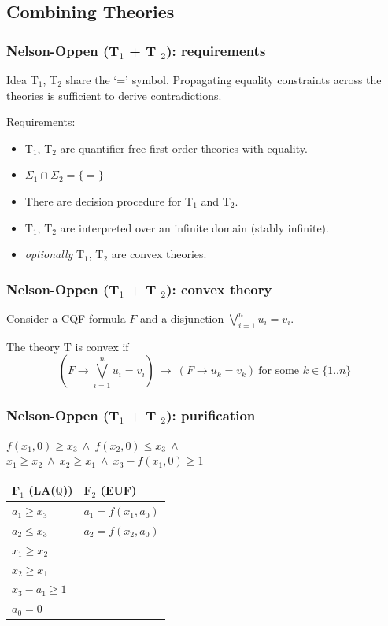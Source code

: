\documentclass{beamer}
\begin{document}
\subsection{Combining Theories}
\begin{frame}
  \frametitle{Nelson-Oppen (T$_1$ + T $_2$): requirements}
  \begin{block}{Idea}
  T$_1$, T$_2$ share the `=' symbol.
  Propagating equality constraints across the theories is sufficient to derive contradictions.
  \end{block}

  \vspace{10pt}
  
  Requirements:
  \begin{itemize}
  \item T$_1$, T$_2$ are quantifier-free first-order theories with equality.
  \item $\Sigma_1 \cap \Sigma_2 = \{=\}$
  \item There are decision procedure for T$_1$ and T$_2$.
  \item T$_1$, T$_2$ are interpreted over an infinite domain (stably infinite).
  \item \emph{optionally} T$_1$, T$_2$ are convex theories.
  \end{itemize}
\end{frame}

\begin{frame}
  \frametitle{Nelson-Oppen (T$_1$ + T $_2$): convex theory}
  Consider a CQF formula $F$ and a disjunction $\bigvee_{i=1}^n u_i = v_i$.

  The theory T is convex if
  \[
    \left( F \rightarrow \bigvee_{i=1}^n u_i = v_i \right)
    ~\rightarrow~ (F \rightarrow u_k = v_k) ~\text{for some $k \in \{1..n\}$}
  \]
  
\end{frame}

\begin{frame}
  \frametitle{Nelson-Oppen (T$_1$ + T $_2$): purification}
  \begin{center}
  $f(x_1, 0) \geq x_3 ~\land~ f(x_2,0) \leq x_3 ~\land$\\
  $x_1 \geq x_2 ~\land~ x_2 \geq x_1 ~\land~ x_3 - f(x_1, 0) \geq 1$

  \vspace{10pt}

  \begin{tabular}{l | l}
  F$_1$ (LA($\mathbb{Q}$)) & F$_2$ (EUF)\\
  \hline
  $a_1 \geq x_3$  &  $a_1 = f(x_1, a_0)$ \\
  $a_2 \leq x_3$  &  $a_2 = f(x_2, a_0)$ \\
  $x_1 \geq x_2$  & \\
  $x_2 \geq x_1$  & \\
  $x_3 - a_1 \geq 1$  & \\
  $a_0 = 0$  & \\
  \end{tabular}
  \end{center}
\end{frame}
\end{document}
